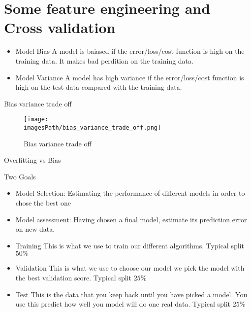 \documentclass{article}
\newcommand{\imagesPath}{images}
\begin{document}
\newpage
\section{Some feature engineering and Cross validation}
\begin{itemize}
    \item Model Bias \newline
    A model is baiased if the error/loss/cost function is high on the training data. It makes bad perdition on the training data.
    \item Model Variance \newline
    A model has high variance if the error/loss/cost function is high on the test data compared with the training data. 
\end{itemize}

Bias variance trade off
\begin{figure}[!h]
    \centering
    \texttt{[image: \\imagesPath/bias\_variance\_trade\_off.png]}
    \caption{Bias variance trade off}
\end{figure}

Overfitting vs Bias 

Two Goals
\begin{itemize}
    \item Model Selection: \newline 
    Estimating the performance of different models in order to chose the best one 
    \item Model assessment: \newline 
    Having chosen a final model, estimate its prediction error on new data. 
\end{itemize}

\begin{itemize}
    \item Training \newline
    This is what we use to train our different algorithms. Typical split $50\%$
    \item Validation \newline 
    This is what we use to choose our model we pick the model with the best validation score. Typical split $25\%$
    \item Test \newline 
    This is the data that you keep back until you have picked a model. You use this predict how well you model will do one real data. Typical split $25\%$
\end{itemize}
\end{document}

